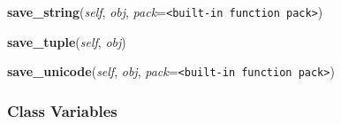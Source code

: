     \label{pickle:Pickler:save_string}

    \vspace{0.5ex}

\hspace{.8\funcindent}\begin{boxedminipage}{\funcwidth}

    \raggedright \textbf{save\_string}(\textit{self}, \textit{obj}, \textit{pack}={\tt {\textless}built-in function pack{\textgreater}})

\setlength{\parskip}{2ex}
\setlength{\parskip}{1ex}
    \end{boxedminipage}

    \label{pickle:Pickler:save_tuple}

    \vspace{0.5ex}

\hspace{.8\funcindent}\begin{boxedminipage}{\funcwidth}

    \raggedright \textbf{save\_tuple}(\textit{self}, \textit{obj})

\setlength{\parskip}{2ex}
\setlength{\parskip}{1ex}
    \end{boxedminipage}

    \label{pickle:Pickler:save_unicode}

    \vspace{0.5ex}

\hspace{.8\funcindent}\begin{boxedminipage}{\funcwidth}

    \raggedright \textbf{save\_unicode}(\textit{self}, \textit{obj}, \textit{pack}={\tt {\textless}built-in function pack{\textgreater}})

\setlength{\parskip}{2ex}
\setlength{\parskip}{1ex}
    \end{boxedminipage}



  \subsubsection{Class Variables}

